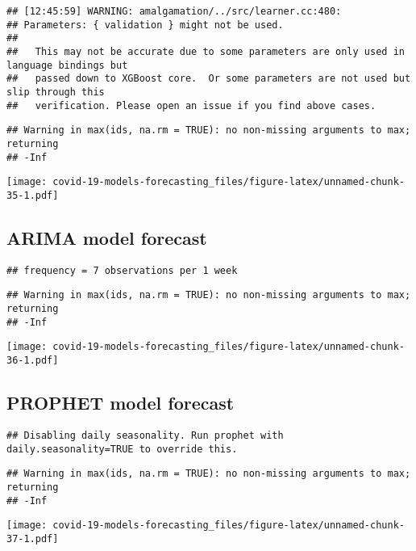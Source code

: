 \documentclass[
]{article}
\begin{document}
\begin{verbatim}
## [12:45:59] WARNING: amalgamation/../src/learner.cc:480: 
## Parameters: { validation } might not be used.
## 
##   This may not be accurate due to some parameters are only used in language bindings but
##   passed down to XGBoost core.  Or some parameters are not used but slip through this
##   verification. Please open an issue if you find above cases.
\end{verbatim}

\begin{verbatim}
## Warning in max(ids, na.rm = TRUE): no non-missing arguments to max; returning
## -Inf
\end{verbatim}

\texttt{[image: covid-19-models-forecasting\_files/figure-latex/unnamed-chunk-35-1.pdf]}

\hypertarget{arima-model-forecast-1}{%
\subsection{ARIMA model forecast}\label{arima-model-forecast-1}}

\begin{verbatim}
## frequency = 7 observations per 1 week
\end{verbatim}

\begin{verbatim}
## Warning in max(ids, na.rm = TRUE): no non-missing arguments to max; returning
## -Inf
\end{verbatim}

\texttt{[image: covid-19-models-forecasting\_files/figure-latex/unnamed-chunk-36-1.pdf]}

\hypertarget{prophet-model-forecast-1}{%
\subsection{PROPHET model forecast}\label{prophet-model-forecast-1}}

\begin{verbatim}
## Disabling daily seasonality. Run prophet with daily.seasonality=TRUE to override this.
\end{verbatim}

\begin{verbatim}
## Warning in max(ids, na.rm = TRUE): no non-missing arguments to max; returning
## -Inf
\end{verbatim}

\texttt{[image: covid-19-models-forecasting\_files/figure-latex/unnamed-chunk-37-1.pdf]}
\end{document}
